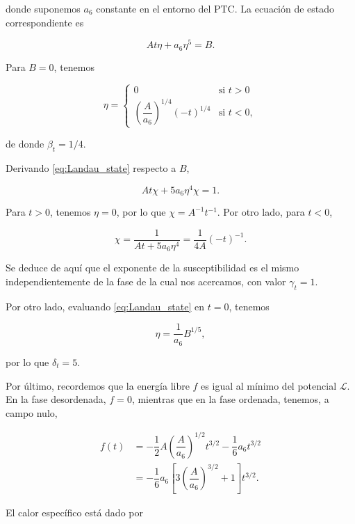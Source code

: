 \documentclass[10pt]{article}
\begin{document}
donde suponemos $a_6$ constante en el entorno del PTC. La ecuaci\'on de estado correspondiente es 

\begin{equation}\label{eq:Landau_state}
At\eta + a_6\eta^5 = B.
\end{equation}

Para $B=0$, tenemos

\[ \eta = \begin{cases} 
      0 & \text{si } t>	 0 \\
      \left(\dfrac{A}{a_6}\right)^{1/4} (-t)^{1/4} &\text{si } t< 0,
   \end{cases}
\]

de donde $\beta_t = 1/4$.

Derivando \ref{eq:Landau_state} respecto a $B$,

\begin{equation}
A t \chi + 5 a_6 \eta^4 \chi = 1.
\end{equation}

Para $t>0$, tenemos $\eta = 0$, por lo que $\chi = A^{-1} t^{-1}$. Por otro lado, para $t<0$,

\begin{equation}
\chi = \dfrac{1}{At + 5a_6\eta^4} = \dfrac{1}{4A} (-t)^{-1}.
\end{equation}

Se deduce de aqu\'i que el exponente de la susceptibilidad es el mismo independientemente de la fase de la cual nos acercamos, con valor $\gamma_t = 1$.

Por otro lado, evaluando \ref{eq:Landau_state} en $t = 0$, tenemos

\begin{equation}
\eta = \dfrac{1}{a_6} B^{1/5},
\end{equation}

por lo que $\delta_t = 5$.

Por \'ultimo, recordemos que la energ\'ia libre $f$ es igual al m\'inimo del potencial $\mathcal{L}$. En la fase desordenada, $f = 0$, mientras que en la fase ordenada, tenemos, a campo nulo,

\begin{align}
f(t) &= -\dfrac{1}{2} A \left( \dfrac{A}{a_6}\right)^{1/2} t^{3/2} - \dfrac{1}{6} a_6 t^{3/2}\\
&= -\dfrac{1}{6}a_6\left[3 \left( \dfrac{A}{a_6}\right)^{3/2} + 1\right] t^{3/2}.
\end{align}

El calor espec\'ifico est\'a dado por
\end{document}
